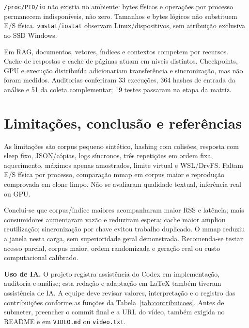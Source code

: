 \documentclass[12pt,a4paper]{article}
\newcommand{\secao}[1]{\clearpage\section{#1}}
\begin{document}
  \texttt{/proc/PID/io} não existia no ambiente: bytes físicos e operações por processo permanecem indisponíveis, não zero. Tamanhos e bytes lógicos não substituem E/S física. \texttt{vmstat}/\texttt{iostat} observam Linux/dispositivos, sem atribuição exclusiva ao SSD Windows.

  Em RAG, documentos, vetores, índices e contextos competem por recursos. Cache de respostas e cache de páginas atuam em níveis distintos. Checkpoints, GPU e execução distribuída adicionariam transferência e sincronização, mas não foram medidos. Auditorias conferiram 33 execuções, 364 hashes de entrada da análise e 51 da coleta complementar; 19 testes passaram na etapa da matriz.

  \secao{Limitações, conclusão e referências}
  As limitações são corpus pequeno sintético, hashing com colisões, resposta com sleep fixo, JSON/cópias, logs síncronos, três repetições em ordem fixa, aquecimento, máximos apenas amostrados, limite virtual e WSL/DrvFS. Faltam E/S física por processo, comparação mmap em corpus maior e reprodução comprovada em clone limpo. Não se avaliaram qualidade textual, inferência real ou GPU.

  Conclui-se que corpus/índice maiores acompanharam maior RSS e latência; mais consumidores aumentaram vazão e reduziram espera; cache maior ampliou reutilização; sincronização por chave evitou trabalho duplicado. O mmap reduziu a janela nesta carga, sem superioridade geral demonstrada. Recomenda-se testar acesso parcial, corpus maior, ordem randomizada e geração real ou custo computacional calibrado.

  \noindent\textbf{Uso de IA.} O projeto registra assistência do Codex em implementação, auditoria e análise; esta redação e adaptação em LaTeX também tiveram assistência de IA. A equipe deve revisar valores, interpretação e o registro das contribuições conforme as funções da Tabela~\ref{tab:contribuicoes}. Antes de submeter, preencher o commit final e a URL do vídeo, também exigida no README e em \texttt{VIDEO.md} ou \texttt{video.txt}.
\end{document}
